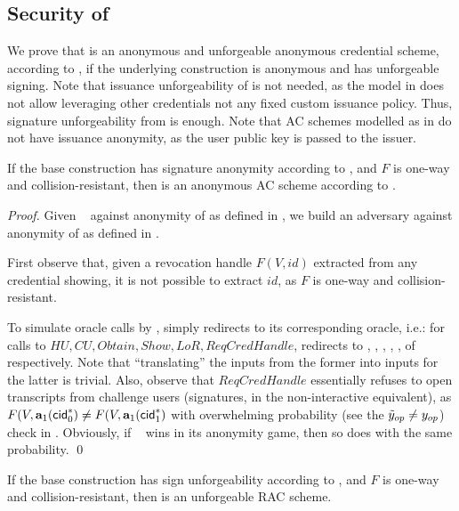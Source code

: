 \subsection{Security of \CUASRAC}

We prove that \CUASRAC is an anonymous and unforgeable anonymous credential
scheme, according to \cite{fhs19}, if the underlying \CUASGen construction
is anonymous and has unforgeable signing. Note that issuance unforgeability
of \CUASGen is not needed, as the model in \cite{fhs19} does not allow
leveraging other credentials not any fixed custom issuance policy. Thus,
signature unforgeability from \UAS is enough. Note that AC schemes modelled
as in \cite{fhs19} do not have issuance anonymity, as the user public key
is passed to the issuer.

\begin{theorem}
  \label{thm:anon-cuasrac}
  If the base \CUASGen construction has signature anonymity according to
  , and $F$ is one-way and collision-resistant,
  then \CUASAC is an anonymous AC scheme according to \cite{fhs19}.
\end{theorem}

\begin{proof}
  Given \adv~ against anonymity of \CUASRAC as defined in
  , we build an adversary \advB against anonymity of
  \CUASGen as defined in .

  First observe that, given a revocation handle $F(V,id)$ extracted from any
  credential showing, it is not possible to extract $id$, as $F$ is one-way
  and collision-resistant.
  
  To simulate oracle calls by \adv, \advB simply redirects to its corresponding
  oracle, i.e.: for calls to $HU,CU,Obtain,Show,LoR,ReqCredHandle$, \advB
  redirects to \HUGEN, \CUGEN, \OBTAIN, \SIGN, \CHALb, of \OPEN respectively.
  Note that ``translating'' the inputs from the former into inputs for the
  latter is trivial. Also, observe that $ReqCredHandle$ essentially refuses to
  open transcripts from challenge users (signatures, in the non-interactive
  equivalent), as $F(V,\mathbf{a}_1(\mathsf{cid}^*_0) \neq F(V,\mathbf{a}_1(\mathsf{cid}^*_1)$ with
  overwhelming probability (see the $\tilde{y}_{op} \neq y_{op}$) check in
  . Obviously, if \adv~ wins in its anonymity game, then
  so does \advB with the same probability.
  \qed
\end{proof}

\begin{theorem}
  If the base \CUASGen construction has sign unforgeability according to
  , and $F$ is one-way and collision-resistant, then
  \CUASRAC is an unforgeable RAC scheme.
\end{theorem}

